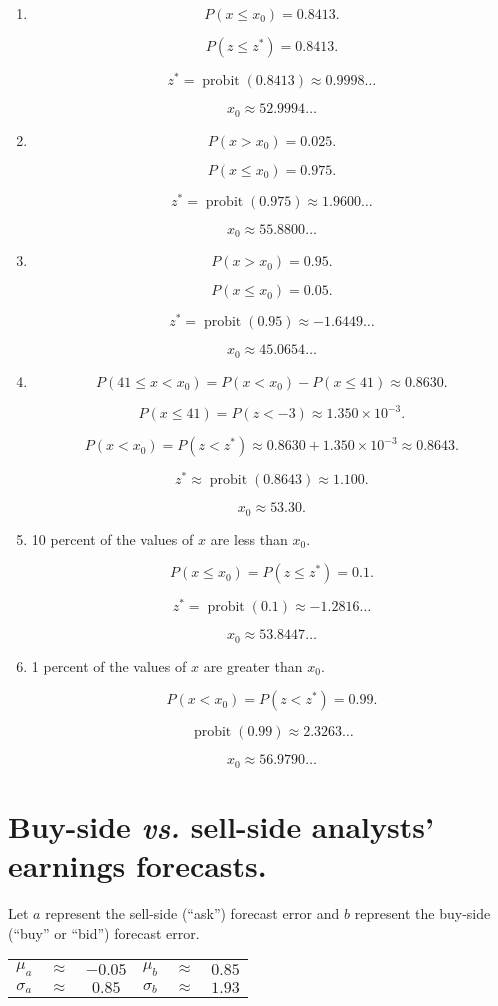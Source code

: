 \documentclass[12pt]{article}
\DeclareMathOperator{\probit}{probit}
\begin{document}
\begin{enumerate}
\item
\[P(x\leq x_0)=0.8413.\]

\[P(z\leq z^*)=0.8413.\]

\[z^*=\probit(0.8413)\approx 0.9998\dots\]

\[x_0\approx 52.9994\dots\]
\item
\[P(x>x_0)=0.025.\]

\[P(x\leq x_0)=0.975.\]

\[z^*=\probit(0.975)\approx 1.9600\dots\]

\[x_0\approx 55.8800\dots\]
\item
\[P(x>x_0)=0.95.\]

\[P(x\leq x_0)=0.05.\]

\[z^*=\probit(0.95)\approx -1.6449\dots\]

\[x_0\approx 45.0654\dots\]
\item
\[P(41\leq x<x_0)=P(x<x_0)-P(x\leq 41)\approx 0.8630.\]

\[P(x\leq 41)=P(z<-3)\approx 1.350\times 10^{-3}.\]

\[P(x<x_0)=P(z<z^*)\approx 0.8630+1.350\times 10^{-3}\approx 0.8643.\]

\[z^*\approx\probit(0.8643)\approx 1.100.\]

\[x_0\approx 53.30.\]
\item 10 percent of the values of $x$ are less than $x_0$.

\[P(x\leq x_0)=P(z\leq z^*)=0.1.\]

\[z^*=\probit(0.1)\approx -1.2816\dots\]

\[x_0\approx 53.8447\dots\]
\item 1 percent of the values of $x$ are greater than $x_0$.

\[P(x<x_0)=P(z<z^*)=0.99.\]

\[\probit(0.99)\approx 2.3263\dots\]

\[x_0\approx 56.9790\dots\]
\end{enumerate}
\section{Buy-side \emph{vs.} sell-side analysts' earnings forecasts.}
Let $a$ represent the sell-side (``ask'') forecast error and $b$ represent the buy-side (``buy'' or ``bid'') forecast error.

\begin{center}
\begin{tabular}{cccccc}
$\mu_a$&$\approx$&$-0.05$&$\mu_b$&$\approx$&$0.85$\\

$\sigma_a$&$\approx$&$0.85$&$\sigma_b$&$\approx$&$1.93$
\end{tabular}
\end{center}
\end{document}
